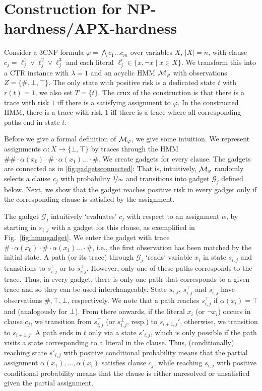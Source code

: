 \documentclass[runningheads]{llncs}
\newcommand{\Obs}{Z}
\begin{document}
{\section{Construction for NP-hardness/APX-hardness}
\label{app:complexity}



Consider a 3CNF formula $\varphi = \bigwedge c_1 \dots c_m$ over variables $X$, $|X|=n$, with clause $c_j = \ell^1_j \lor \ell^2_j \lor \ell^3_j$ and each literal $\ell^i_j \in \{ x, \neg x \mid x \in X\}$. We transform this into a CTR instance with $\lambda = 1$ and an acyclic HMM $\mathcal{M}_\varphi$  with observations $\Obs= \{ \#, \bot, \top \}$. The only state with positive risk  is a dedicated state $t$ with $r(t) = 1$, we also set $T=\{t\}$. The crux of the construction is that there is a trace with risk $1$ iff there is a satisfying assignment to $\varphi$. In the constructed HMM, there is a trace with risk $1$ iff there is a trace where all corresponding paths end in state $t$.

Before we give a formal definition of $\mathcal{M}_\varphi$, we give some intuition.
We represent assignments $\alpha\colon X \rightarrow \{\bot,\top \}$ by traces through the HMM $\#\# \cdot \alpha(x_0) \cdot \# \cdot \alpha(x_1) \dots \cdot \#$. We create gadgets for every clause. The gadgets are connected as in \cref{fig:gadgetsconnected}: That is, intuitively, $\mathcal{M}_\varphi$ randomly selects a clause $c_j$ with probability $\nicefrac{1}{m}$ and transitions into gadget $\mathcal{G}_j$ defined below. Next, we show that the gadget reaches positive risk in every gadget only if the corresponding clause is satisfied by the assignment.

The gadget $\mathcal{G}_j$ intuitively `evaluates' $c_j$ with respect to an assignment $\alpha$, by starting in $s_{1,j}$ with a gadget for this clause, as exemplified in Fig.~\ref{fig:hmmgadget}.  We enter the gadget with trace $\# \cdot \alpha(x_0) \cdot \# \cdot \alpha(x_1) \dots \cdot \#$, i.e., the first observation has been matched by the initial state.
A path (or its trace) through $\mathcal{G}_j$ `reads' variable $x_i$ in state $s_{i,j}$ and transitions to $s_{i,j}^\top$ or to $s_{i,j}^\bot$. However, only one of these paths corresponds to the trace. Thus, in every gadget, there is only one path that corresponds to a given trace and so they can be used interchangeably.
State $s_{i,j}$, $s_{i,j}^\top$ and $s_{i,j}^\bot$ have observations $\#, \top, \bot$, respectively. We note that a path  reaches $s_{i,j}^\top$ if $\alpha(x_i) = \top$ and (analogously for $\bot$).
From there onwards,  if the literal $x_i$ (or $\neg x_i$) occurs in clause $c_j$, we transition from $s_{i,j}^\top$ (or $s_{i,j}^\bot$, resp.) to $s_{i+1,j}'$, otherwise, we transition to $s_{i+1,j}$. A path ends in $t$ only via a state $s'_{i,j}$, which is only possible if the path visits a state corresponding to a literal in the clause. Thus, (conditionally) reaching state $s'_{i,j}$ with positive conditional probability means that the partial assignment $\alpha(x_1),\dots,\alpha(x_i)$ satisfies clause $c_j$, while reaching $s_{i,j}$ with positive conditional probability means that the clause is either unresolved or unsatisfied given the partial assignment.


}
\end{document}
